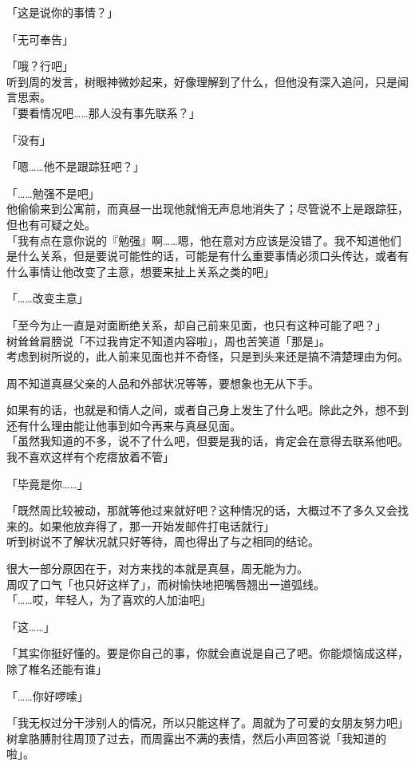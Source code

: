 「这是说你的事情？」

「无可奉告」

「哦？行吧」\\

听到周的发言，树眼神微妙起来，好像理解到了什么，但他没有深入追问，只是闻言思索。\\

「要看情况吧……那人没有事先联系？」

「没有」

「嗯……他不是跟踪狂吧？」

「……勉强不是吧」\\

他偷偷来到公寓前，而真昼一出现他就悄无声息地消失了；尽管说不上是跟踪狂，但也有可疑之处。\\

「我有点在意你说的『勉强』啊……嗯，他在意对方应该是没错了。我不知道他们是什么关系，但是要说可能性的话，可能是有什么重要事情必须口头传达，或者有什么事情让他改变了主意，想要来扯上关系之类的吧」

「……改变主意」

「至今为止一直是对面断绝关系，却自己前来见面，也只有这种可能了吧？」\\

树耸耸肩膀说「不过我肯定不知道内容啦」，周也苦笑道「那是」。\\

考虑到树所说的，此人前来见面也并不奇怪，只是到头来还是搞不清楚理由为何。

周不知道真昼父亲的人品和外部状况等等，要想象也无从下手。

如果有的话，也就是和情人之间，或者自己身上发生了什么吧。除此之外，想不到还有什么理由能让他事到如今再来与真昼见面。\\

「虽然我知道的不多，说不了什么吧，但要是我的话，肯定会在意得去联系他吧。我不喜欢这样有个疙瘩放着不管」

「毕竟是你……」

「既然周比较被动，那就等他过来就好吧？这种情况的话，大概过不了多久又会找来的。如果他放弃得了，那一开始发邮件打电话就行」\\

听到树说不了解状况就只好等待，周也得出了与之相同的结论。

很大一部分原因在于，对方来找的本就是真昼，周无能为力。\\

周叹了口气「也只好这样了」，而树愉快地把嘴唇翘出一道弧线。\\

「……哎，年轻人，为了喜欢的人加油吧」

「这……」

「其实你挺好懂的。要是你自己的事，你就会直说是自己了吧。你能烦恼成这样，除了椎名还能有谁」

「……你好啰嗦」

「我无权过分干涉别人的情况，所以只能这样了。周就为了可爱的女朋友努力吧」\\

树拿胳膊肘往周顶了过去，而周露出不满的表情，然后小声回答说「我知道的啦」。
